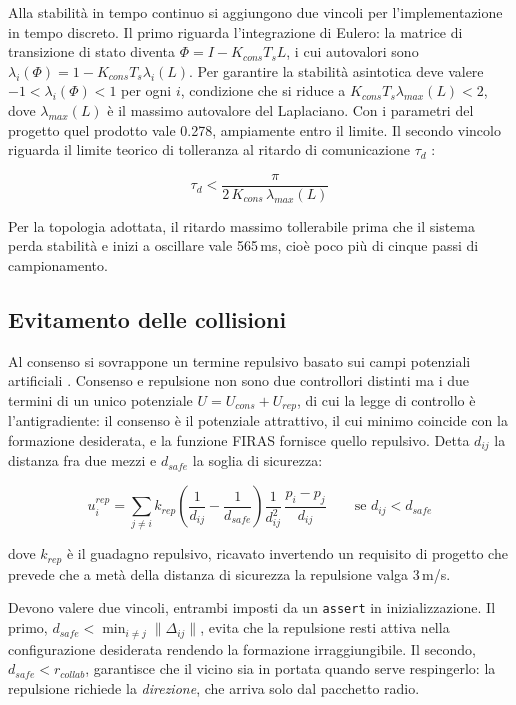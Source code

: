 \documentclass[conference,9pt]{IEEEtran}
\begin{document}
Alla stabilit\`a in tempo continuo si aggiungono due vincoli per
l'implementazione in tempo discreto. Il primo riguarda l'integrazione di
Eulero: la matrice di transizione di stato diventa
$\Phi = I - K_{cons} T_s L$, i cui autovalori sono
$\lambda_{i}(\Phi) = 1 - K_{cons} T_s \lambda_{i}(L)$. Per garantire la
stabilit\`a asintotica deve valere $-1 < \lambda_{i}(\Phi) < 1$ per ogni $i$,
condizione che si riduce a $K_{cons} T_s \lambda_{max}(L) < 2$, dove
$\lambda_{max}(L)$ \`e il massimo autovalore del Laplaciano. Con i parametri
del progetto quel prodotto vale 0.278, ampiamente entro il limite. Il secondo
vincolo riguarda il limite teorico di tolleranza al ritardo di comunicazione
$\tau_d$ \cite{olfati2004}:

\begin{equation}
\tau_d < \frac{\pi}{2\,K_{cons}\,\lambda_{max}(L)}
\label{eq:ritardo}
\end{equation}

Per la topologia adottata, il ritardo massimo tollerabile prima che il sistema
perda stabilit\`a e inizi a oscillare vale 565\,ms, cio\`e poco pi\`u di cinque
passi di campionamento.

\subsection{Evitamento delle collisioni}

Al consenso si sovrappone un termine repulsivo basato sui campi potenziali
artificiali \cite{khatib1986}. Consenso e repulsione non sono due controllori
distinti ma i due termini di un unico potenziale
$U = U_{cons} + U_{rep}$, di cui la legge di controllo \`e l'antigradiente: il
consenso \`e il potenziale attrattivo, il cui minimo coincide con la formazione
desiderata, e la funzione FIRAS fornisce quello repulsivo. Detta $d_{ij}$ la
distanza fra due mezzi e $d_{safe}$ la soglia di sicurezza:

\begin{equation}
u_i^{rep} = \sum_{j \neq i} k_{rep}
\left(\frac{1}{d_{ij}} - \frac{1}{d_{safe}}\right)\frac{1}{d_{ij}^2}\,
\frac{p_i - p_j}{d_{ij}}
\qquad \text{se } d_{ij} < d_{safe}
\label{eq:firas}
\end{equation}

dove $k_{rep}$ \`e il guadagno repulsivo, ricavato invertendo un requisito di
progetto che prevede che a met\`a della distanza di sicurezza la repulsione
valga 3\,m/s.

Devono valere due vincoli, entrambi imposti da un \texttt{assert} in
inizializzazione. Il primo, $d_{safe} < \min_{i \neq j}\lVert\Delta_{ij}\rVert$,
evita che la repulsione resti attiva nella configurazione desiderata rendendo la
formazione irraggiungibile. Il secondo, $d_{safe} < r_{collab}$, garantisce che
il vicino sia in portata quando serve respingerlo: la repulsione richiede la
\emph{direzione}, che arriva solo dal pacchetto radio.
\end{document}
